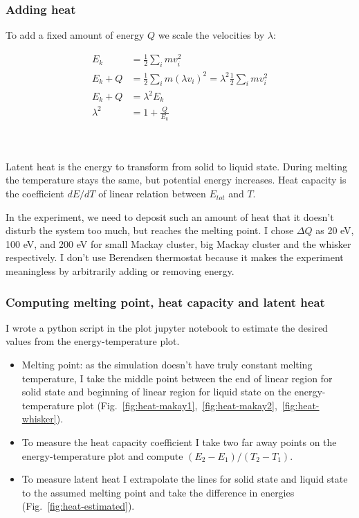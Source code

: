 \documentclass[12pt,a4paper]{article}
\newcommand{\framed}[1]{\tikz[baseline=(char.base)]{\node[shape=rectangle,draw,inner sep=4pt] (char) {#1};}}
\begin{document}
\clearpage

\subsubsection*{Adding heat}

To add a fixed amount of energy $Q$ we scale the velocities by $\lambda$:

\[
\begin{aligned}
	E_k &= \frac{1}{2} \sum_i m v_i^2 \\
	E_k + Q &= \frac{1}{2} \sum_i m (\lambda v_i)^2 = \lambda^2 \frac{1}{2} \sum_i m v_i^2 \\
	E_k + Q &= \lambda^2 E_k \\
	\lambda^2 &= 1 + \frac{Q}{E_k} \\
\end{aligned}
\]

{\centering\framed{ \( \lambda = \sqrt{1 + \frac{Q}{E_k}} \) }\\}

Latent heat is the energy to transform from solid to liquid state. During melting the temperature stays the same, but potential energy increases. Heat capacity is the coefficient $dE/dT$ of linear relation between $E_{tot}$ and $T$.

In the experiment, we need to deposit such an amount of heat that it doesn't disturb the system too much, but reaches the melting point. I chose $\Delta Q$ as 20 eV, 100 eV, and 200 eV for small Mackay cluster, big Mackay cluster and the whisker respectively. I don't use Berendsen thermostat because it makes the experiment meaningless by arbitrarily adding or removing energy.

\subsubsection*{Computing melting point, heat capacity and latent heat}
I wrote a python script in the plot jupyter notebook to estimate the desired values from the energy-temperature plot.

\begin{itemize}
	\item Melting point: as the simulation doesn't have truly constant melting temperature, I take the middle point between the end of linear region for solid state and beginning of linear region for liquid state on the energy-temperature plot (Fig.~\ref{fig:heat-makay1},~\ref{fig:heat-makay2},~\ref{fig:heat-whisker}).
	\item To measure the heat capacity coefficient I take two far away points on the energy-temperature plot and compute $(E_2-E_1)/(T_2-T_1)$.
	\item To measure latent heat I extrapolate the lines for solid state and liquid state to the assumed melting point and take the difference in energies (Fig.~\ref{fig:heat-estimated}).
\end{itemize}
\end{document}

